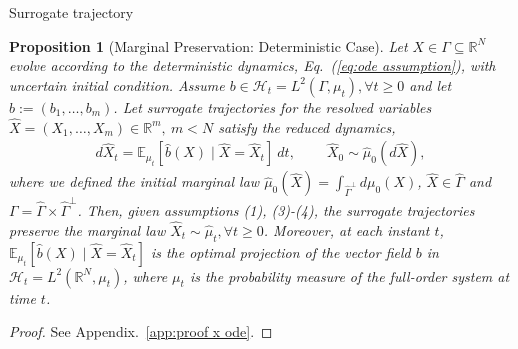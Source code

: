 \documentclass[11pt, a4paper, oneside, reqno]{amsart}
\makeatletter
\def\subsubsection{\@startsection{subsubsection}{3}%
	\z@{.5\linespacing\@plus.7\linespacing}{.5\linespacing}%
	{\normalfont\itshape}}
\newtheorem{proposition}[theorem]{Proposition}
\makeatother
\begin{document}
\subsubsection{Surrogate trajectory}
\begin{proposition}[Marginal Preservation: Deterministic Case]\label{prop:deterministic}
Let $X\in\Gamma\subseteq\mathbb{R}^N$ evolve according to the deterministic dynamics, Eq.~(\ref{eq:ode assumption}), with uncertain initial condition. Assume $b\in \mathcal{H}_t=L^2(\Gamma,\mu_t), \forall t \geq 0$ and let $\hat{b}:=(b_1,\dots,b_m)$. Let surrogate trajectories for the resolved variables $\hat{X}=(X_1,\dots,X_m)\in\mathbb{R}^m, \ m<N$ satisfy the reduced dynamics,
\begin{eqnarray}\label{eq:surrogate dynamics proposition}
    d\hat{X}_t = \mathbb{E}_{\mu_t}[\hat{b}(X)\mid\hat{X} = \hat{X}_t] \ dt, \ \qquad
    \hat{X}_0 \sim \hat{\mu}_0(d\hat{X}),
\end{eqnarray}
where we defined the initial marginal law $\hat{\mu}_0(\hat{X})=\int_{\hat{\Gamma}^\perp}d\mu_0(X)$, $\hat{X}\in\hat{\Gamma}$ and $\Gamma=\hat{\Gamma}\times\hat{\Gamma}^\perp$.
Then, given assumptions (1), (3)-(4), the surrogate trajectories preserve the marginal law $\hat{X}_t\sim\hat{\mu}_t, \forall t\geq 0$. 
Moreover, at each instant $t$, $\mathbb{E}_{\mu_t}[\hat{b}(X)\mid\hat{X} = \hat{X}_t]$ is the optimal projection of the vector field $b$ in $\mathcal{H}_t=L^2(\mathbb{R}^N,\mu_t)$, where $\mu_t$ is the probability measure of the full-order system at time $t$. 
\end{proposition}
\begin{proof}
    See Appendix.~\ref{app:proof x ode}.
\end{proof}
\end{document}
